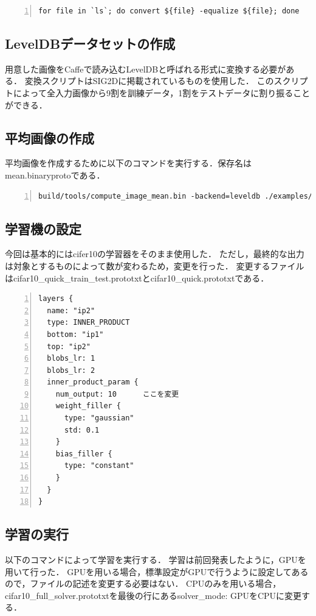 \documentclass[a4paper,10pt]{jsarticle}
\begin{document}
\begin{lstlisting}[basicstyle=\ttfamily\footnotesize, frame=single, firstnumber=1, numbers=left, breaklines=true]
for file in `ls`; do convert ${file} -equalize ${file}; done
\end{lstlisting}

\subsection{LevelDBデータセットの作成}
用意した画像をCaffeで読み込むLevelDBと呼ばれる形式に変換する必要がある．
変換スクリプトはSIG2D\cite{SIG2D}に掲載されているものを使用した．
このスクリプトによって全入力画像から9割を訓練データ，1割をテストデータに割り振ることができる．

\subsection{平均画像の作成}
平均画像を作成するために以下のコマンドを実行する．保存名はmean.binaryprotoである．
\begin{lstlisting}[basicstyle=\ttfamily\footnotesize, frame=single, firstnumber=1, numbers=left, breaklines=true]
build/tools/compute_image_mean.bin -backend=leveldb ./examples/cifar10/cifar10_train_leveldb ./examples/cifar10/mean.binaryproto
\end{lstlisting}

\subsection{学習機の設定}
今回は基本的にはcifer10の学習器をそのまま使用した．
ただし，最終的な出力は対象とするものによって数が変わるため，変更を行った．
変更するファイルはcifar10\_quick\_train\_test.prototxtとcifar10\_quick.prototxtである．

\begin{lstlisting}[basicstyle=\ttfamily\footnotesize, frame=single, firstnumber=1, numbers=left, breaklines=true]
layers {
  name: "ip2"
  type: INNER_PRODUCT
  bottom: "ip1"
  top: "ip2"
  blobs_lr: 1
  blobs_lr: 2
  inner_product_param {
    num_output: 10      ここを変更
    weight_filler {
      type: "gaussian"
      std: 0.1
    }
    bias_filler {
      type: "constant"
    }
  }
}
\end{lstlisting}

\subsection{学習の実行}
以下のコマンドによって学習を実行する．
学習は前回発表したように，GPUを用いて行った．
GPUを用いる場合，標準設定がGPUで行うように設定してあるので，ファイルの記述を変更する必要はない．
CPUのみを用いる場合，cifar10\_full\_solver.prototxtを最後の行にあるsolver\_mode: GPUをCPUに変更する．
\end{document}

